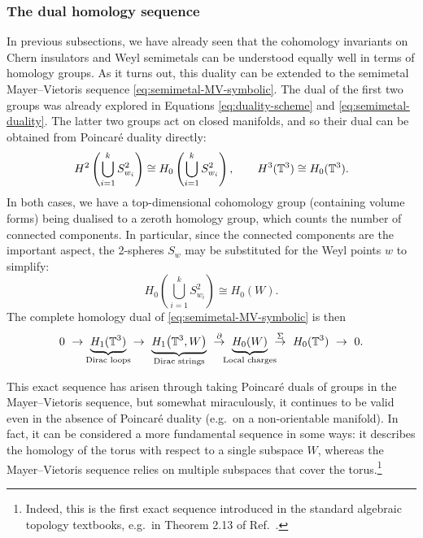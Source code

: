 \subsubsection{The dual homology sequence}

In previous subsections, we have already seen that the cohomology invariants on Chern insulators and Weyl semimetals can be understood equally well in terms of homology groups. As it turns out, this duality can be extended to the semimetal Mayer--Vietoris sequence \eqref{eq:semimetal-MV-symbolic}. The dual of the first two groups was already explored in Equations \eqref{eq:duality-scheme} and \eqref{eq:semimetal-duality}. The latter two groups act on closed manifolds, and so their dual can be obtained from Poincar\'e duality directly:
\begin{equation*}
	H^2\left(\bigcup_{i=1}^k S_{w_i}^2\right) \cong H_0\left(\bigcup_{i=1}^k S_{w_i}^2\right), \qquad
	H^3(\mathbb{T}^3) \cong H_0(\mathbb{T}^3).
\end{equation*}
In both cases, we have a top-dimensional cohomology group (containing volume forms) being dualised to a zeroth homology group, which counts the number of connected components. In particular, since the connected components are the important aspect, the 2-spheres $S_w$ may be substituted for the Weyl points $w$ to simplify:
\begin{equation*}
	H_0\left(\bigcup_{i=1}^k S_{w_i}^2\right) \cong H_0(W).
\end{equation*}
The complete homology dual of \eqref{eq:semimetal-MV-symbolic} is then
\begin{equation}\label{eq:semimetal-homology-sequence}
	0\ \to\ \underbrace{H_1(\T^3)}_{\mathclap{\text{Dirac loops}}}\ \to\ 
	\underbrace{H_1\big(\T^3, W\big)}_{\text{Dirac strings}}\ \overset{\partial}{\to}\ \underbrace{H_0(W)}_{\mathclap{\text{Local charges}}}\ \overset{\Sigma}{\to}\ H_0(\T^3)\ \to\ 0.
\end{equation}

This exact sequence has arisen through taking Poincaré duals of groups in the Mayer--Vietoris sequence, but somewhat miraculously, it continues to be valid even in the absence of Poincaré duality (e.g.\ on a non-orientable manifold). In fact, it can be considered a more fundamental sequence in some ways: it describes the homology of the torus with respect to a single subspace $W$, whereas the Mayer--Vietoris sequence relies on multiple subspaces that cover the torus.\footnote{
	Indeed, this is the first exact sequence introduced in the standard algebraic topology textbooks, e.g.\ in Theorem 2.13 of Ref.~\cite{Hatcher_algebraic-topology}.}
	
